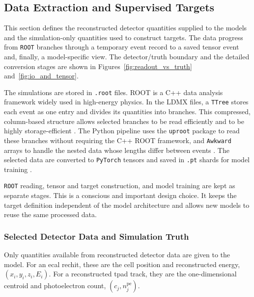 










\subsection{Data Extraction and Supervised Targets}
\label{sec:method_processing}

This section defines the reconstructed detector quantities supplied to the
models and the simulation-only quantities used to construct targets. The data
progress from \texttt{ROOT} branches through a temporary event record to a
saved tensor event and, finally, a model-specific view. The detector/truth
boundary and the detailed conversion stages are shown in
Figures~\ref{fig:readout_vs_truth} and~\ref{fig:io_and_tensor}.

The simulations are stored in \texttt{.root} files. ROOT is a C++ data
analysis framework widely used in high-energy physics. In the LDMX files, a
\texttt{TTree} stores each event as one entry and divides its quantities into
branches. This compressed, column-based structure allows selected branches to
be read efficiently and to be highly storage-efficient \cite{ROOT_NIMA_1997,root_about,root_ttree}. The Python
pipeline uses the \texttt{uproot} package to read these branches without requiring the
C++ ROOT framework, and \texttt{Awkward} arrays to handle the nested data whose
lengths differ between events \cite{uproot_software,uproot_docs,awkward_docs}.
The selected data are converted to \texttt{PyTorch} tensors and saved in
\texttt{.pt} shards for model training \cite{pytorch_docs}.

\texttt{ROOT} reading, tensor and target construction, and model training are
kept as separate stages. This is a conscious and important design choice. It
keeps the target definition independent of the model architecture and allows
new models to reuse the same processed data.





\subsubsection{Selected Detector Data and Simulation Truth}

Only quantities available from reconstructed detector data are given to the
model. For an \gls{ecal} \gls{rechit}, these are the cell position and reconstructed
energy, \((x_i,y_i,z_i,E_i)\). For a reconstructed \gls{tpad} track, they are
the one-dimensional centroid and photoelectron count,
\((c_j,n_j^{\mathrm{pe}})\).

